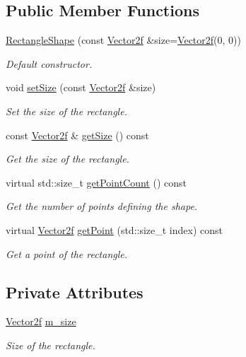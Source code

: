 \subsection*{Public Member Functions}
\begin{DoxyCompactItemize}
\item 
\mbox{\hyperlink{classsf_1_1_rectangle_shape_a83a2be157ebee85c95ed491c3e78dd7c}{Rectangle\+Shape}} (const \mbox{\hyperlink{classsf_1_1_vector2}{Vector2f}} \&size=\mbox{\hyperlink{classsf_1_1_vector2}{Vector2f}}(0, 0))
\begin{DoxyCompactList}\small\item\em Default constructor. \end{DoxyCompactList}\item 
void \mbox{\hyperlink{classsf_1_1_rectangle_shape_a5c65d374d4a259dfdc24efdd24a5dbec}{set\+Size}} (const \mbox{\hyperlink{classsf_1_1_vector2}{Vector2f}} \&size)
\begin{DoxyCompactList}\small\item\em Set the size of the rectangle. \end{DoxyCompactList}\item 
const \mbox{\hyperlink{classsf_1_1_vector2}{Vector2f}} \& \mbox{\hyperlink{classsf_1_1_rectangle_shape_ae54a07ff5537bf76de6748f592b34896}{get\+Size}} () const
\begin{DoxyCompactList}\small\item\em Get the size of the rectangle. \end{DoxyCompactList}\item 
virtual std\+::size\+\_\+t \mbox{\hyperlink{classsf_1_1_rectangle_shape_adfb2f429e5720c9ccdb26d5996c3ae33}{get\+Point\+Count}} () const
\begin{DoxyCompactList}\small\item\em Get the number of points defining the shape. \end{DoxyCompactList}\item 
virtual \mbox{\hyperlink{classsf_1_1_vector2}{Vector2f}} \mbox{\hyperlink{classsf_1_1_rectangle_shape_a3909f1a1946930ff5ae17c26206c0f81}{get\+Point}} (std\+::size\+\_\+t index) const
\begin{DoxyCompactList}\small\item\em Get a point of the rectangle. \end{DoxyCompactList}\end{DoxyCompactItemize}
\subsection*{Private Attributes}
\begin{DoxyCompactItemize}
\item 
\mbox{\label{classsf_1_1_rectangle_shape_ab97ec42ef436e2a622b7a853c9202118}} 
\mbox{\hyperlink{classsf_1_1_vector2}{Vector2f}} \mbox{\hyperlink{classsf_1_1_rectangle_shape_ab97ec42ef436e2a622b7a853c9202118}{m\+\_\+size}}
\begin{DoxyCompactList}\small\item\em Size of the rectangle. \end{DoxyCompactList}\end{DoxyCompactItemize}
